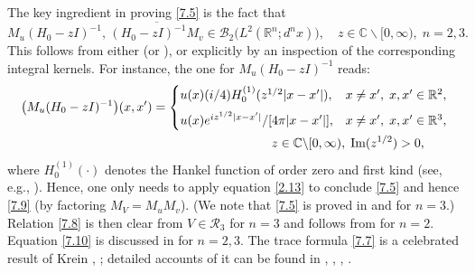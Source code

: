 \documentclass[reqno,10pt, centertags]{amsart}
\newcounter{count}
\newcommand{\bbR}{{\mathbb{R}}}
\newcommand{\bbC}{{\mathbb{C}}}
\newcommand{\cB}{{\mathcal B}}
\newcommand{\cR}{{\mathcal R}}
\newcommand{\no}{\nonumber}
\newcommand{\lb}{\label}
\newcommand{\ol}{\overline}
\renewcommand{\Im}{\text{\rm Im}}
\numberwithin{equation}{section}
\theoremstyle{definition}
\begin{document}
The key ingredient in proving \eqref{7.5} is the fact that
\begin{equation}
M_u(H_0-zI)^{-1}, \, \ol{(H_0-zI)^{-1}M_v} \in\cB_2\big(L^2(\bbR^n;d^n
x)\big),
\quad z\in\bbC\backslash [0,\infty), \; n=2,3.  \lb{7.10a}
\end{equation}
This follows from either \cite[Theorem 4.1]{Si79} (or \cite[Theorem
XI.20]{RS79}), or explicitly by an inspection of the corresponding integral
kernels. For instance, the one for $M_u(H_0-zI)^{-1}$ reads:
\begin{align}
& \big(M_u(H_0-zI)^{-1}\big)(x,x')= \begin{cases}
u(x)(i/4)H_0^{(1)}(z^{1/2}|x-x'|), & x \neq x', \; x,
x'\in\bbR^2,  \\[2mm]
u(x)e^{i z^{1/2}|x-x'|}/[4\pi |x-x'|], &x \neq x', \; x, x'\in\bbR^3,
\end{cases} \no \\
& \hspace*{7cm}  z\in\bbC\backslash [0,\infty), \; \Im(z^{1/2})>0,
\lb{7.10b}
\end{align}
where $H_0^{(1)}(\cdot)$ denotes the Hankel function of order zero and
first kind (see, e.g., \cite[Sect.\ 9.1]{AS72}). Hence, one only needs to
apply equation \eqref{2.13} to conclude \eqref{7.5} and hence \eqref{7.9}
(by factoring $M_V=M_u M_v$). (We note that \eqref{7.5} is proved in
\cite[Sect.\ XI.6]{RS79} and \cite[Theorem II.37]{Si71} for $n=3$.)
Relation \eqref{7.8} is then clear from
$V\in\cR_3$ for $n=3$ and follows from \cite{Si76} for $n=2$. Equation
\eqref{7.10} is discussed in \cite{BGGSS87} for $n=2,3$. The trace
formula \eqref{7.7} is a celebrated result of Krein
\cite{Kr53}, \cite{Kr62}; detailed accounts of it can be found in
\cite[Sect.\ 19.1.5]{BW83}, \cite{BY93}, \cite{Kr83}, \cite[Ch.\ 8]{Ya92}.
\end{document}
